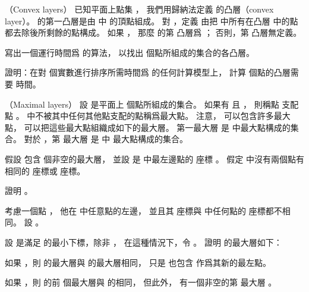 \startsubject[
  title={Problems},
]

\startPROBLEM
（Convex layers）
已知平面上點集 ，
我們用歸納法定義  的{\EMP 凸層}（convex layer）。
  的第一凸層是由  中  的頂點組成。
對 ，定義  由把  中所有在凸層  中的點
都去除後所剩餘的點構成。
如果 ，
那麼  的第  凸層爲 ；
否則，第  凸層無定義。

\startigBase[a]\startitem
寫出一個運行時間爲  的算法，
以找出  個點所組成的集合的各凸層。
\stopitem\stopigBase

\startANSWER
{}
\stopANSWER

\startigBase[continue]\startitem
證明：在對  個實數進行排序所需時間爲  的任何計算模型上，
計算  個點的凸層需要  時間。
\stopitem\stopigBase

\startANSWER
{}
\stopANSWER
\stopPROBLEM

\startPROBLEM
（Maximal layers）
設  是平面上  個點所組成的集合。
如果有  且 ，
則稱點  {\EMP 支配} 點 。
  中不被其中任何其他點支配的點稱爲{\EMP 最大點}。
注意，  可以包含許多最大點，
可以把這些最大點組織成如下的最大層。
第一最大層  是  中最大點構成的集合。
對於 ，第  最大層  是  中
最大點構成的集合。

假設  包含  個非空的最大層，
並設  是  中最左邊點的  座標 。
假定  中沒有兩個點有相同的  座標或  座標。

\startigBase[a]\startitem
證明 。
\stopitem\stopigBase

\startANSWER
{}
\stopANSWER

考慮一個點 ，
他在  中任意點的左邊，
並且其  座標與  中任何點的  座標都不相同。
設 。

\startigBase[continue]\startitem
設  是滿足  的最小下標，除非 ，
在這種情況下，令 。
證明  的最大層如下：
\startigBase
\item 如果 ，則  的最大層與  的最大層相同，
只是  也包含  作爲其新的最左點。
\item 如果 ，則  的前  個最大層與  的相同，
但此外，  有一個非空的第  最大層 。
\stopigBase
\stopitem\stopigBase

